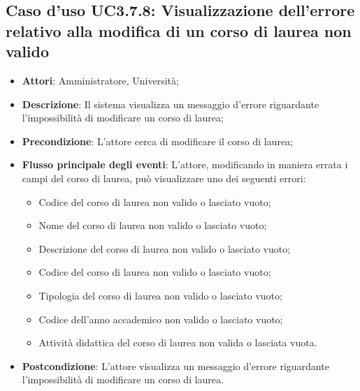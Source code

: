 \subsection{Caso d'uso \texorpdfstring{UC3.7.8}{UC3.7.8}: Visualizzazione dell'errore relativo alla modifica di un corso di laurea non valido}
\begin{itemize}
\item \textbf{Attori}: Amministratore, Università;
\item \textbf{Descrizione}: Il sistema visualizza un messaggio d'errore riguardante l'impossibilità di modificare un corso di laurea;

\item \textbf{Precondizione}: L'attore cerca di modificare il corso di laurea;

\item \textbf{Flusso principale degli eventi}: L'attore, modificando in maniera errata i campi del corso di laurea, può visualizzare uno dei seguenti errori: \begin{itemize} 
\item Codice del corso di laurea non valido o lasciato vuoto; 
\item Nome del corso di laurea non valido o lasciato vuoto; 
\item Descrizione del corso di laurea non valido o lasciato vuoto; 
\item Codice del corso di laurea non valido o lasciato vuoto; 
\item Tipologia del corso di laurea non valido o lasciato vuoto; 
\item Codice dell'anno accademico non valido o lasciato vuoto; 
\item Attività didattica del corso di laurea non valida o lasciata vuota.
\end{itemize}
\item \textbf{Postcondizione}: L'attore visualizza un messaggio d'errore riguardante l'impossibilità di modificare un corso di laurea.


\end{itemize}
